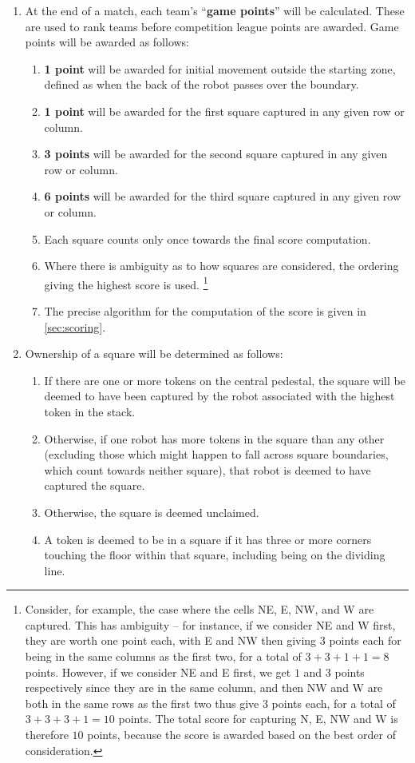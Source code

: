 \begin{enumerate}
\item At the end of a match, each team's ``\textbf{game points}'' will be calculated.
      These are used to rank teams before competition league points are awarded.
      Game points will be awarded as follows:
\begin{enumerate}
  \item \textbf{1 point} will be awarded for initial movement outside the starting zone, defined as when the back of the robot passes over the boundary.
  \item \textbf{1 point} will be awarded for the first square captured in any given row or column.
  \item \textbf{3 points} will be awarded for the second square captured in any given row or column.
  \item \textbf{6 points} will be awarded for the third square captured in any given row or column.
  \item Each square counts only once towards the final score computation.
  \item Where there is ambiguity as to how squares are considered, the ordering giving the highest score is used.
        \footnote{Consider, for example, the case where the cells NE, E, NW, and W are
                  captured. This has ambiguity -- for instance, if we consider NE and
                  W first, they are worth one point each, with E and NW then giving $3$
                  points each for being in the same columns as the first two, for a total
                  of $3+3+1+1 = 8$ points. However, if we consider NE and E first, we get $1$
                  and $3$ points respectively since they are in the same column, and then NW
                  and W are both in the same rows as the first two thus give $3$ points each,
                  for a total of $3+3+3+1 = 10$ points. The total score for capturing N, E,
                  NW and W is therefore $10$ points, because the score is awarded based on
                  the best order of consideration.}
  \item The precise algorithm for the computation of the score is given in \autoref{sec:scoring}.
\end{enumerate}

\item Ownership of a square will be determined as follows:
\begin{enumerate}
  \item If there are one or more tokens on the central pedestal, the square will be deemed to have been captured by the robot associated with the highest token in the stack.
  \item Otherwise, if one robot has more tokens in the square than any other (excluding those which might happen to fall across square boundaries, which count towards neither square), that robot is deemed to have captured the square.
  \item Otherwise, the square is deemed unclaimed.
  \item A token is deemed to be in a square if it has three or more corners touching the floor within that square, including being on the dividing line.
\end{enumerate}


\end{enumerate}
